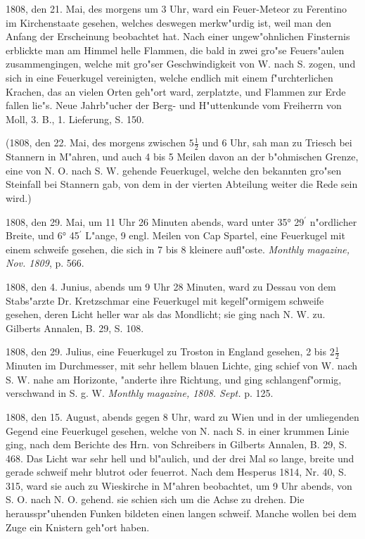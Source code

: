 \documentclass[a4paper, 11pt, oneside, polutonikogreek, german]{article}
\begin{document}
1808, den 21. Mai, des morgens um 3 Uhr, ward ein Feuer-Meteor zu Ferentino im Kirchenstaate gesehen, welches deswegen merkw"urdig ist, weil man den Anfang der Erscheinung beobachtet hat. Nach einer ungew"ohnlichen Finsternis erblickte man am Himmel helle Flammen, die bald in zwei gro"se Feuers"aulen zusammengingen, welche mit gro"ser Geschwindigkeit von W. nach S. zogen, und sich in eine Feuerkugel vereinigten, welche endlich mit einem f"urchterlichen Krachen, das an vielen Orten geh"ort ward, zerplatzte, und Flammen zur Erde fallen lie"s. Neue Jahrb"ucher der Berg- und H"uttenkunde vom Freiherrn von Moll, 3. B., 1. Lieferung, S. 150.

(1808, den 22. Mai, des morgens zwischen $\mathfrak{5\frac{1}{2}}$ und 6 Uhr, sah man zu Triesch bei Stannern in M"ahren, und auch 4 bis 5 Meilen davon an der b"ohmischen Grenze, eine von N. O. nach S. W. gehende Feuerkugel, welche den bekannten gro"sen Steinfall bei Stannern gab, von dem in der vierten Abteilung weiter die Rede sein wird.)

1808, den 29. Mai, um 11 Uhr 26 Minuten abends, ward unter 35° 29$^{\prime}$ n"ordlicher Breite, und 6° 45$^{\prime}$ L"ange, 9 engl. Meilen von Cap Spartel, eine Feuerkugel mit einem schweife gesehen, die sich in 7 bis 8 kleinere aufl"oste. \emph{Monthly magazine, Nov. 1809}, p. 566.

1808, den 4. Junius, abends um 9 Uhr 28 Minuten, ward zu Dessau von dem Stabs"arzte Dr. Kretzschmar eine Feuerkugel mit kegelf"ormigem schweife gesehen, deren Licht heller war als das Mondlicht; sie ging nach N. W. zu. Gilberts Annalen, B. 29, S. 108.

1808, den 29. Julius, eine Feuerkugel zu Troston in England gesehen, 2 bis $\mathfrak{2\frac{1}{2}}$ Minuten im Durchmesser, mit sehr hellem blauen Lichte, ging schief von W. nach S. W. nahe am Horizonte, "anderte ihre Richtung, und ging schlangenf"ormig, verschwand in S. g. W. \emph{Monthly magazine, 1808. Sept.} p. 125.

1808, den 15. August, abends gegen 8 Uhr, ward zu Wien und in der umliegenden Gegend eine Feuerkugel gesehen, welche von N. nach S. in einer krummen Linie ging, nach dem Berichte des Hrn. von Schreibers in Gilberts Annalen, B. 29, S. 468. Das Licht war sehr hell und bl"aulich, und der drei Mal so lange, breite und gerade schweif mehr blutrot oder feuerrot. Nach dem Hesperus 1814, Nr. 40, S. 315, ward sie auch zu Wieskirche in M"ahren beobachtet, um 9 Uhr abends, von S. O. nach N. O. gehend. sie schien sich um die Achse zu drehen. Die herausspr"uhenden Funken bildeten einen langen schweif. Manche wollen bei dem Zuge ein Knistern geh"ort haben.
\end{document}
